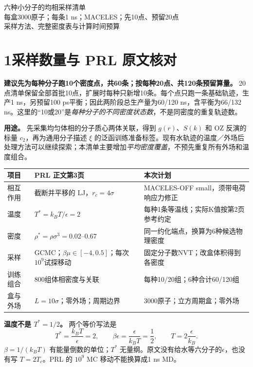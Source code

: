 \documentclass[a4paper]{ctexart}
\begin{document}
\begin{center}
{\LARGE 六种小分子的均相采样清单}\\[6pt]
{\large 每盒3000原子；每条1 ns；MACELES；先10点、预留20点}\\[4pt]
采样方法、完整密度表与计算时间预算
\end{center}

\section*{1\quad 采样数量与 PRL 原文核对}
\textbf{建议先为每种分子跑10个密度点，共60条；按每种20点、共120条预留算量。}
20点清单保留全部首批10点，扩展时每种只新增10条。每个点只跑一条基础轨迹，生产1 ns，另预留100 ps平衡；因此两阶段总生产量为60/120 ns，含平衡为66/132 ns。这里的“10或20”是\emph{每种分子的不同密度状态数}，不是同密度的重复轨迹数。

\textbf{用途。} 先采集均匀体相的分子质心两体关联，得到 $g(r)$、$S(k)$ 和 OZ 反演的标量 $c_2$，再为通用分子描述 $\xi$ 的泛函训练准备标签。现有水轨迹的温度／外场后处理方法可以继续探索；本清单主要增加\emph{平均密度覆盖}，不预先重复所有外场和温度组合。

\begin{center}\small
\begin{tabularx}{\textwidth}{lXX}\toprule
项目 & PRL 正文第3页 & 本次计划\\\midrule
相互作用 & 截断并平移的 LJ，$r_c=4\sigma$ & MACELES-OFF small，须带电荷响应力修正\\
温度 & $T^*=k_BT/\epsilon=2$ & 每种1条等温线；实际K值按第2页参考约定\\
密度 & $\rho^*=\rho\sigma^3=0.02$--$0.67$ & 同一约化端点，换算为6种候选物理密度\\
采样 & GCMC；$\beta\mu\in[-4,0.5]$；每次$10^9$试探移动 & 固定分子数NVT；改盒体积得到各密度\\
训练组合 & 800组体相密度与关联 & 每种10/20组；6种合计60/120组\\
盒与外场 & $L=10\sigma$；零外场；周期边界 & 3000原子；立方周期盒；零外场\\\bottomrule
\end{tabularx}\end{center}

\textbf{温度不是 $T^*=1/2$。} 两个等价写法是
\[
T^*=\frac{k_BT}{\epsilon}=2,
\qquad \beta\epsilon=\frac{\epsilon}{k_BT}=\frac12,
\qquad T=2\frac{\epsilon}{k_B}.
\]
$\beta=1/(k_BT)$ 有能量倒数的单位；$T^*$ 无量纲。原文没有给水等六分子的$\epsilon$，也没有写 $T=2T_c$。PRL 的 $10^9$ MC 移动不能换算成1 ns MD。
\end{document}
